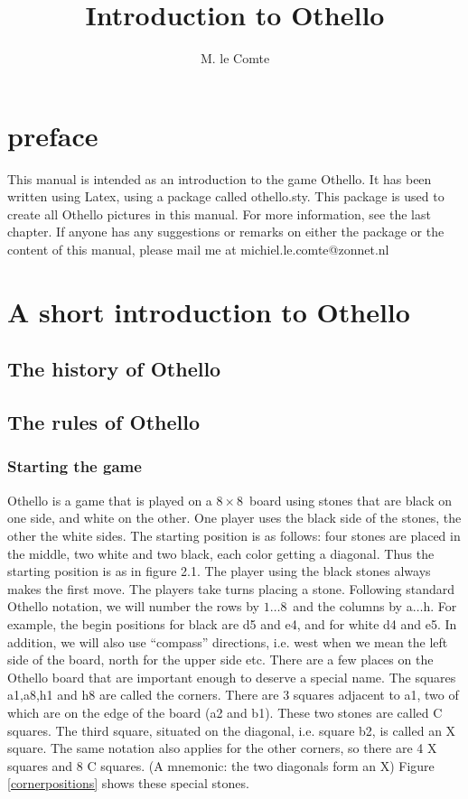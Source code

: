 \documentclass[12pt,twoside]{report}
\newcommand{\clearemptydoublepage}{\newpage{\pagestyle{empty}\cleardoublepage}}
\begin{document}
\initfloatingfigs

\title{Introduction to Othello}
\author{M. le Comte}
\maketitle

\clearemptydoublepage
\chapter{preface}
This manual is intended as an introduction to the game Othello. It
has been written using Latex, using a package called othello.sty.
This package is used to create all Othello pictures in this
manual. For more information, see the last chapter. If anyone has
any suggestions or remarks on either the package or the content of
this manual, please mail me at michiel.le.comte@zonnet.nl
\clearemptydoublepage
\tableofcontents
\chapter{A short introduction to Othello}
\section{The history of Othello}
\section{The rules of Othello}

\subsection{Starting the game}
\begin{figure}[h]
\startposition
\end{figure}


Othello is a game that is played on a $8\times 8$\ board using
stones that are black on one side, and white on the other.
One player uses the black side of the stones, the other the white sides.
The starting position is as follows: four stones are placed in the middle, two
white and two black, each color getting a diagonal. Thus the
starting position is as in figure 2.1. The player using the black
stones always makes the first move. The players take
turns placing a stone. Following standard Othello notation, we will number
the rows by $1\ldots 8$\ and the columns by a$\ldots$h. For
example, the begin positions for black are d5 and e4, and for
white d4 and e5. In addition, we will also use ``compass''
directions, i.e. west when we mean the left side of the board,
north for the upper side etc. There are a few places on the Othello
board that are important enough to deserve a special name. The
squares a1,a8,h1 and h8 are called the corners. There are 3 squares
adjacent to a1, two of which are on the edge of the board (a2 and
b1). These two stones are called C squares. The third square,
situated on the diagonal, i.e. square b2, is called an X square.
The same notation also applies for the other corners, so there are
4 X squares and 8 C squares. (A mnemonic: the two diagonals form
an X) Figure \ref{cornerpositions} shows these special stones.
\end{document}
